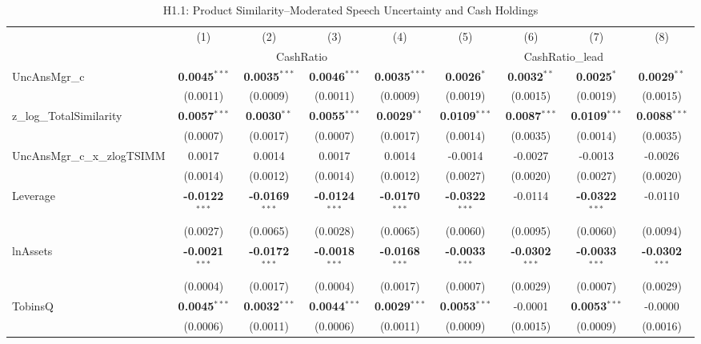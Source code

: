 \documentclass[11pt,a4paper]{article}
\begin{document}
\begin{table}[htbp]
\centering
\caption{H1.1: Product Similarity--Moderated Speech Uncertainty and Cash Holdings}
\label{tab:h1_1}
\scriptsize
\begin{tabular}{lcccccccc}
\toprule
 & (1) & (2) & (3) & (4) & (5) & (6) & (7) & (8) \\
 & \multicolumn{4}{c}{CashRatio} & \multicolumn{4}{c}{CashRatio\_lead} \\
\cmidrule(lr){2-5} \cmidrule(lr){6-9}
\midrule
UncAnsMgr\_c & \textbf{0.0045}$^{***}$ & \textbf{0.0035}$^{***}$ & \textbf{0.0046}$^{***}$ & \textbf{0.0035}$^{***}$ & \textbf{0.0026}$^{*}$ & \textbf{0.0032}$^{**}$ & \textbf{0.0025}$^{*}$ & \textbf{0.0029}$^{**}$ \\
 & (0.0011) & (0.0009) & (0.0011) & (0.0009) & (0.0019) & (0.0015) & (0.0019) & (0.0015) \\
z\_log\_TotalSimilarity & \textbf{0.0057}$^{***}$ & \textbf{0.0030}$^{**}$ & \textbf{0.0055}$^{***}$ & \textbf{0.0029}$^{**}$ & \textbf{0.0109}$^{***}$ & \textbf{0.0087}$^{***}$ & \textbf{0.0109}$^{***}$ & \textbf{0.0088}$^{***}$ \\
 & (0.0007) & (0.0017) & (0.0007) & (0.0017) & (0.0014) & (0.0035) & (0.0014) & (0.0035) \\
UncAnsMgr\_c\_x\_zlogTSIMM & 0.0017 & 0.0014 & 0.0017 & 0.0014 & -0.0014 & -0.0027 & -0.0013 & -0.0026 \\
 & (0.0014) & (0.0012) & (0.0014) & (0.0012) & (0.0027) & (0.0020) & (0.0027) & (0.0020) \\
\midrule
Leverage & \textbf{-0.0122}$^{***}$ & \textbf{-0.0169}$^{***}$ & \textbf{-0.0124}$^{***}$ & \textbf{-0.0170}$^{***}$ & \textbf{-0.0322}$^{***}$ & -0.0114 & \textbf{-0.0322}$^{***}$ & -0.0110 \\
 & (0.0027) & (0.0065) & (0.0028) & (0.0065) & (0.0060) & (0.0095) & (0.0060) & (0.0094) \\
lnAssets & \textbf{-0.0021}$^{***}$ & \textbf{-0.0172}$^{***}$ & \textbf{-0.0018}$^{***}$ & \textbf{-0.0168}$^{***}$ & \textbf{-0.0033}$^{***}$ & \textbf{-0.0302}$^{***}$ & \textbf{-0.0033}$^{***}$ & \textbf{-0.0302}$^{***}$ \\
 & (0.0004) & (0.0017) & (0.0004) & (0.0017) & (0.0007) & (0.0029) & (0.0007) & (0.0029) \\
TobinsQ & \textbf{0.0045}$^{***}$ & \textbf{0.0032}$^{***}$ & \textbf{0.0044}$^{***}$ & \textbf{0.0029}$^{***}$ & \textbf{0.0053}$^{***}$ & -0.0001 & \textbf{0.0053}$^{***}$ & -0.0000 \\
 & (0.0006) & (0.0011) & (0.0006) & (0.0011) & (0.0009) & (0.0015) & (0.0009) & (0.0016) \\

\end{tabular}
\end{table}
\end{document}
